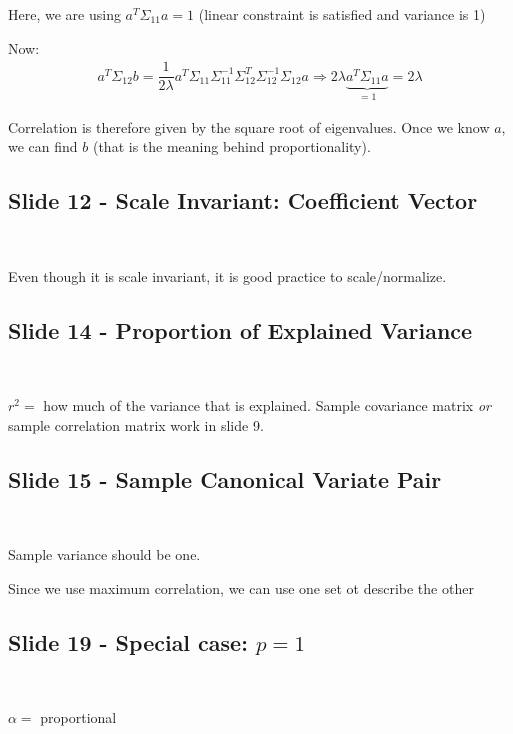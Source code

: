 \noindent Here, we are using $a^T\Sigma_{11}a = 1$ (linear constraint is satisfied and variance is 1)
\par\bigskip
\noindent Now:
\begin{equation*}
  \begin{gathered}
    a^T\Sigma_{12}b = \dfrac{1}{2\lambda}a^T\Sigma_{11}\Sigma_{11}^{-1}\Sigma_{12}^T\Sigma_{12}^{-1}\Sigma_{12}a \Rightarrow 2\lambda \underbrace{a^T\Sigma_{11}a}_{\text{$=1$}} = 2\lambda
  \end{gathered}
\end{equation*}
\par\bigskip
\noindent Correlation is therefore given by the square root of eigenvalues. Once we know $a$, we can find $b$ (that is the meaning behind proportionality).
\par\bigskip
\subsection{Slide 12 - Scale Invariant: Coefficient Vector}\hfill\\\par
\noindent Even though it is scale invariant, it is good practice to scale/normalize.
\par\bigskip
\subsection{Slide 14 - Proportion of Explained Variance}\hfill\\\par
\noindent $r^2 = $ how much of the variance that is explained. Sample covariance matrix \textit{or} sample correlation matrix work in slide 9.
\par\bigskip
\subsection{Slide 15 - Sample Canonical Variate Pair}\hfill\\\par
\noindent Sample variance should be one.\par
\noindent Since we use maximum correlation, we can use one set ot describe the other
\par\bigskip
\subsection{Slide 19 - Special case: $p=1$}\hfill\\\par
\noindent $\alpha = $ proportional
\par\bigskip
